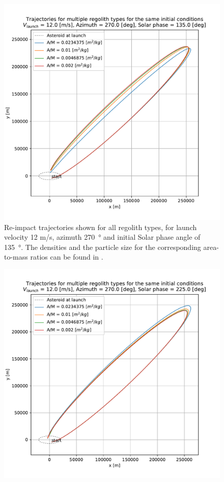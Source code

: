 \documentclass[print]{tudelft-report}
\begin{document}
\begin{appendices}
\begin{figure}[htb]
    \includegraphics[width=\textwidth, height=0.5\textheight, keepaspectratio=true]{Results/Images/trailing_edge_perturbations/reimpact_traj_12ms_270Azim_135solarPhase.pdf}
    \caption{Re-impact trajectories shown for all regolith types, for launch velocity 12 m/s, azimuth \SI{270}{\degree} and initial Solar phase angle of \SI{135}{\degree}. The densities and the particle size for the corresponding area-to-mass ratios can be found in .}
    \label{fig:trailingEdge_reimpact_traj_12ms_270azim_135solar}
    \end{figure}
    \FloatBarrier
    \begin{figure}[htb]
    \centering
    \captionsetup{justification=centering}
    \includegraphics[width=\textwidth, height=0.5\textheight, keepaspectratio=true]{Results/Images/trailing_edge_perturbations/reimpact_traj_12ms_270Azim_225solarPhase.pdf}

\end{figure}
\end{appendices}
\end{document}
